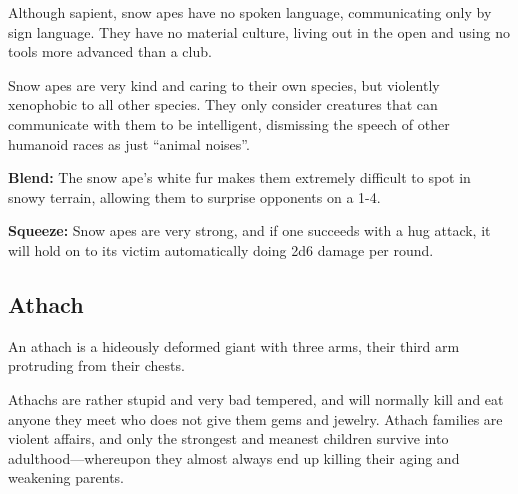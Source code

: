 \begin{multicols*}{2}
Although sapient, snow apes have no spoken language, communicating only by sign language. They have no material culture, living out in the open and using no tools more advanced than a club.

Snow apes are very kind and caring to their own species, but violently xenophobic to all other species. They only consider creatures that can communicate with them to be intelligent, dismissing the speech of other humanoid races as just “animal noises”.

\textbf{Blend:} The snow ape's white fur makes them extremely difficult to spot in snowy terrain, allowing them to surprise opponents on a 1-4.

\textbf{Squeeze:} Snow apes are very strong, and if one succeeds with a hug attack, it will hold on to its victim automatically doing 2d6 damage per round.

\subsection{Athach}

An athach is a hideously deformed giant with three arms, their third arm protruding from their chests.

Athachs are rather stupid and very bad tempered, and will normally kill and eat anyone they meet who does not give them gems and jewelry. Athach families are violent affairs, and only the strongest and meanest children survive into adulthood—whereupon they almost always end up killing their aging and weakening parents.


\end{multicols*}
